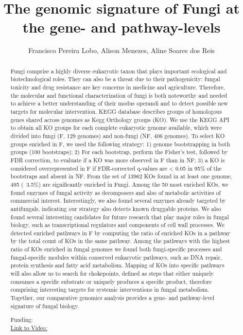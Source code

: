 \documentclass[twoside]{article}
\title{\vspace{-15mm}\fontsize{24pt}{10pt}\selectfont\textbf{ The genomic signature of Fungi at the gene- and pathway-levels }} %
\author{ Francisco Pereira Lobo,  Alison Menezes,  Aline Soares dos Reis }
\affil{ UNIVERSIDADE FEDERAL DE MINAS GERAIS,  UNIVERSIDADE FEDERAL DE MINAS GERAIS }
\date{}
\begin{document}
  
  
  \maketitle %
  
  
  \thispagestyle{fancy} %
  
  
  \begin{abstract}
  Fungi comprise a highly diverse eukaryotic taxon that plays important ecological and biotechnological roles. They can also be a threat due to their pathogenicity: fungal toxicity and drug resistance are key concerns in medicine and agriculture. Therefore,  the molecular and functional characterization of fungi is both noteworthy and needed to achieve a better understanding of their modus operandi and to detect possible new targets for molecular intervention.
KEGG database describes groups of homologous genes shared across genomes as Kegg Orthology groups (KO). We use the KEGG API to obtain all KO groups for each complete eukaryotic genome available,  which were divided into fungi (F,  129 genomes) and non-fungi (NF,  406 genomes). To select KO groups enriched in F,  we used the following strategy: 1) genome bootstrapping in both groups (100 bootstraps); 2) For each bootstrap,  perform the Fisher’s test,  followed by FDR correction,  to evaluate if a KO was more observed in F than in NF; 3) a KO is considered overrepresented in F if FDR-corrected q-values are < 0.05 in 95\% of the bootstraps and absent in NF.
From the set of 13962 KOs found in at least one genome,  495 (~3.5\%) are significantly enriched in Fungi. Among the 50 most enriched KOs,  we found enzymes of fungal activity as decomposers and also of metabolic activities of commercial interest. Interestingly,  we also found several enzymes already targeted by antifungals,  indicating our strategy also detects known druggable proteins. We also found several interesting candidates for future research that play major roles in fungal biology,  such as transcriptional regulators and components of cell wall processes.
We detected enriched pathways in F by computing the ratio of enriched KOs in a pathway by the total count of KOs in the same pathway. Among the pathways with the highest ratio of KOs enriched in fungal genomes we found both fungi-specific processes and fungal-specific modules within conserved eukaryotic pathways,  such as DNA repair,  protein synthesis and fatty acid metabolism. Mapping of KOs into specific pathways will also allow us to search for chokepoints,  defined as steps that either uniquely consumes a specific substrate or uniquely produces a specific product,  therefore comprising interesting targets for systemic interventions in fungal metabolism. Together,  our comparative genomics analysis provides a gene- and pathway-level signature of fungal biology.
  
  Funding:   \\
  \href{http://ab3c.org.br/xpress_pres2020/xmxp2020-298111.html}{Link to Video:}

  \end{abstract}
   
  
\end{document}
